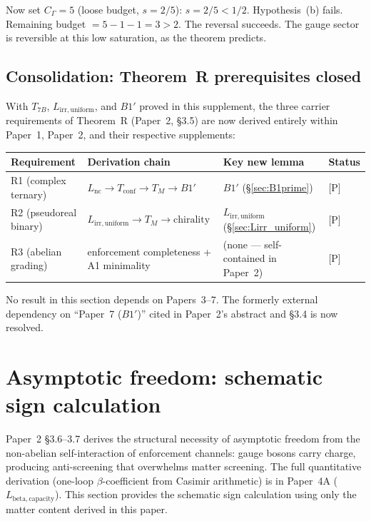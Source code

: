 \documentclass[11pt,a4paper]{article}
\theoremstyle{definition}
\begin{document}
Now set $C_\Gamma = 5$ (loose budget, $s = 2/5$):
$s = 2/5 < 1/2$.  Hypothesis~(b) fails.
Remaining budget $= 5 - 1 - 1 = 3 > 2$.  The reversal succeeds.
The gauge sector is reversible at this low saturation, as the theorem
predicts.


\subsection{Consolidation: Theorem~R prerequisites closed}
\label{sec:TR_closed}

With $T_{7B}$, $L_{\mathrm{irr,uniform}}$, and $B1'$ proved in this
supplement, the three carrier requirements of Theorem~R
(Paper~2, §3.5) are now derived entirely within Paper~1, Paper~2, and
their respective supplements:

\smallskip
\begin{center}
\small
\begin{tabular}{@{}llll@{}}
\toprule
\textbf{Requirement} & \textbf{Derivation chain} & \textbf{Key new lemma} & \textbf{Status} \\
\midrule
R1 (complex ternary) &
  $L_{\mathrm{nc}} \to T_{\mathrm{conf}} \to T_M \to B1'$ &
  $B1'$ (\S\ref{sec:B1prime}) &
  [P] \\
R2 (pseudoreal binary) &
  $L_{\mathrm{irr,uniform}} \to T_M \to \text{chirality}$ &
  $L_{\mathrm{irr,uniform}}$ (\S\ref{sec:Lirr_uniform}) &
  [P] \\
R3 (abelian grading) &
  enforcement completeness + A1 minimality &
  (none --- self-contained in Paper~2) &
  [P] \\
\bottomrule
\end{tabular}
\end{center}

\smallskip\noindent No result in this section depends on Papers~3--7.
The formerly external dependency on ``Paper~7 ($B1'$)'' cited in
Paper~2's abstract and §3.4 is now resolved.


\newpage


\section{Asymptotic freedom: schematic sign calculation}
\label{sec:beta_schematic}

Paper~2 \S3.6--3.7 derives the structural necessity of asymptotic freedom
from the non-abelian self-interaction of enforcement channels: gauge
bosons carry charge, producing anti-screening that overwhelms matter
screening.  The full quantitative derivation (one-loop $\beta$-coefficient
from Casimir arithmetic) is in Paper~4A ($L_{\mathrm{beta,capacity}}$).
This section provides the schematic sign calculation using only the
matter content derived in this paper.
\end{document}
